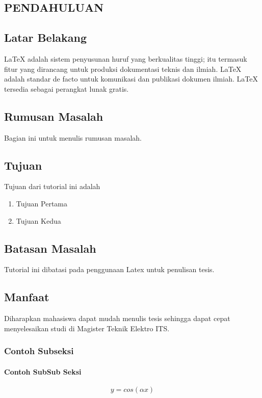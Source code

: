 
\begin{spacing}{1.2}
  \chapter{PENDAHULUAN}
\end{spacing}


\vspace{4ex}

\section{Latar Belakang}
LaTeX adalah sistem penyusunan huruf yang berkualitas tinggi; itu termasuk fitur yang dirancang untuk produksi dokumentasi teknis dan ilmiah. LaTeX adalah standar de facto untuk komunikasi dan publikasi dokumen ilmiah. LaTeX tersedia sebagai perangkat lunak gratis.

\section{Rumusan Masalah}
Bagian ini untuk menulis rumusan masalah.
\section{Tujuan}
Tujuan dari tutorial ini adalah \cite{Koza1996}
\begin{enumerate}
	\item Tujuan Pertama
	\item Tujuan Kedua
\end{enumerate}
\section{Batasan Masalah}
Tutorial ini dibatasi pada penggunaan Latex untuk penulisan tesis. 
\section{Manfaat}
Diharapkan mahasiswa dapat mudah menulis tesis sehingga dapat cepat menyelesaikan studi di Magister Teknik Elektro ITS.
\subsection{Contoh Subseksi }
\subsubsection{Contoh SubSub Seksi}

\begin{equation}
y=cos(\alpha x)
\end{equation}
